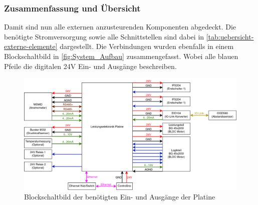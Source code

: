 \subsubsection{Zusammenfassung und Übersicht}
Damit sind nun alle externen anzusteurenden Komponenten abgedeckt. Die benötigte Stromversorgung sowie alle Schnittstellen sind dabei in \autoref{tab:uebersicht-externe-elemente} dargestellt. Die Verbindungen wurden ebenfalls in einem Blockschaltbild in \autoref{fig:System_Aufbau} zusammengefasst. Wobei alle blauen Pfeile die digitalen 24V Ein- und Ausgänge beschreiben.
\begin{figure}[H]
	\centering
	\includegraphics[width=1.0\textwidth]{images/System/Systemaufbau.drawio.png}
	\caption{Blockschaltbild der benötigten Ein- und Ausgänge der Platine}
	\label{fig:System_Aufbau}
\end{figure}

